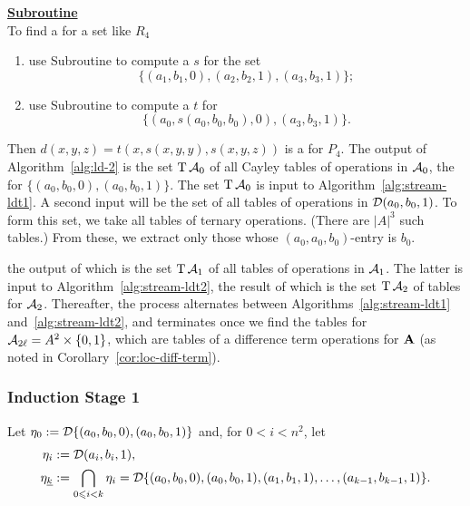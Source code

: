   \noindent \underline{\textbf{Subroutine }}\\[4pt]
  To find a \ldto for a set like $R_4$
  \begin{enumerate}
  \item
  use Subroutine  to compute a \ldto $s$ for the set
  \begin{equation*}
  \{(a_1, b_1, 0), (a_2, b_2, 1), (a_3, b_3, 1)\};
  \end{equation*}
  \item use Subroutine  to compute a \ldto $t$ for
  \begin{equation*}
  \{(a_0, s(a_0, b_0, b_0), 0), (a_3, b_3, 1)\}.
  \end{equation*}
  \end{enumerate}
  Then
  $d(x,y,z) = t(x, s(x,y,y), s(x,y,z))$
  is a \ldto for $P_4$.
  The output of Algorithm~\ref{alg:ld-2} is the set $\operatorname{T} \mathcal{A}_0$ of all
Cayley tables of operations in $\mathcal{A}_0$, the \ldtos for $\{(a_0, b_0, 0), (a_0, b_0, 1)\}$.
The set $\operatorname{T} \mathcal{A}_0$ is input to Algorithm~\ref{alg:stream-ldt1}.
A second input will be the set of all tables of operations in
$\mathcal{D} (a_0, b_0, 1)$.  To form this set, we take all tables of ternary operations.
(There are $|A|^3$ such tables.) From these, we extract only those whose
$(a_0, a_0, b_0)$-entry is $b_0$.

the output of which is the set $\operatorname{T} \mathcal{A}_1$ of all tables of
operations in $\mathcal{A}_1$.
The latter is input to Algorithm~\ref{alg:stream-ldt2}, the result of which is
the set $\operatorname{T} \mathcal{A}_2$ of tables for $\mathcal{A}_2$.
Thereafter, the process alternates between
Algorithms~\ref{alg:stream-ldt1} and~\ref{alg:stream-ldt2}, and
terminates once we find the tables for $\mathcal{A}_{2\ell} = A^2 \times \{0,1\}$,
which are tables of a difference term operations for $\mathbf{A}$ (as noted
in Corollary~\ref{cor:loc-diff-term}).

\subsubsection{Induction Stage 1}
Let $\eta_0 := \mathcal{D} \{(a_0, b_0, 0), (a_0, b_0, 1)\}$ and, for $0 < i < n^2$, let
\begin{align*}
  \eta_i &:= \mathcal{D} (a_i, b_i, 1),\\
  \eta_{\underline{k}} &:= \bigcap_{0\leqslant i < k}\eta_i
  =\mathcal{D} \{(a_0, b_0, 0),(a_0, b_0, 1), (a_1, b_1, 1), \dots, (a_{k-1}, b_{k-1}, 1) \}.
\end{align*}

